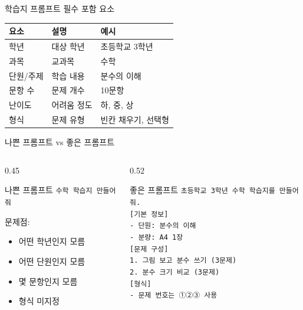 \documentclass[aspectratio=169, 11pt]{beamer}
\begin{document}
\begin{frame}{학습지 프롬프트 필수 포함 요소}
\begin{center}
\begin{tabular}{|l|l|l|}
\hline
\textbf{요소} & \textbf{설명} & \textbf{예시} \\
\hline
학년 & 대상 학년 & 초등학교 3학년 \\
\hline
과목 & 교과목 & 수학 \\
\hline
단원/주제 & 학습 내용 & 분수의 이해 \\
\hline
문항 수 & 문제 개수 & 10문항 \\
\hline
난이도 & 어려움 정도 & 하, 중, 상 \\
\hline
형식 & 문제 유형 & 빈칸 채우기, 선택형 \\
\hline
\end{tabular}
\end{center}
\end{frame}

\begin{frame}{나쁜 프롬프트 vs 좋은 프롬프트}
\begin{columns}[T]
\begin{column}{0.45\textwidth}
\begin{alertblock}{ 나쁜 프롬프트}
\small
\texttt{수학 학습지 만들어줘}

\vspace{0.2cm}

문제점:
\begin{itemize}
  \item 어떤 학년인지 모름
  \item 어떤 단원인지 모름
  \item 몇 문항인지 모름
  \item 형식 미지정
\end{itemize}
\end{alertblock}
\end{column}

\begin{column}{0.52\textwidth}
\begin{exampleblock}{ 좋은 프롬프트}
\scriptsize
\texttt{초등학교 3학년 수학 학습지를 만들어줘.}\\
\texttt{[기본 정보]}\\
\texttt{- 단원: 분수의 이해}\\
\texttt{- 분량: A4 1장}\\
\texttt{[문제 구성]}\\
\texttt{1. 그림 보고 분수 쓰기 (3문제)}\\
\texttt{2. 분수 크기 비교 (3문제)}\\
\texttt{[형식]}\\
\texttt{- 문제 번호는 ①②③ 사용}
\end{exampleblock}
\end{column}
\end{columns}
\end{frame}
\end{document}
